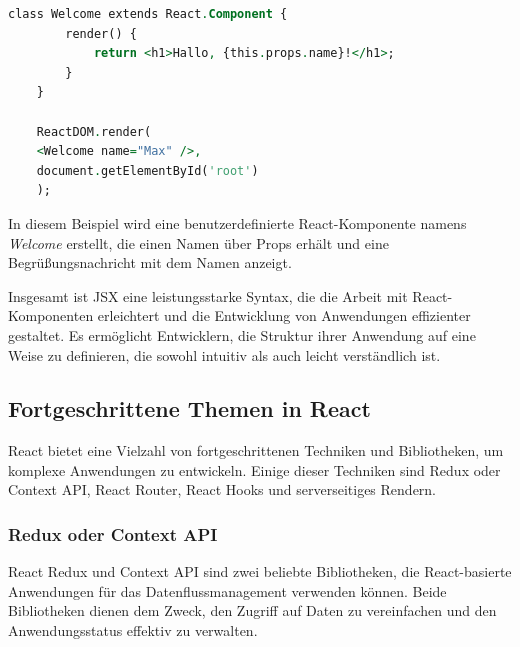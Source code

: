 \begin{lstlisting}[language=vhdl,
	frame=single,           % Ein Rahmen um den Code
	framexleftmargin=15pt,  % Rahmen link von den Zahlen
	style=algoBericht,
	label={JSX},
	captionpos=b ,          % Caption unter den Code setzen
	caption={Beispiel JSX }]
class Welcome extends React.Component {
        render() {
        	return <h1>Hallo, {this.props.name}!</h1>;
        }
    }

    ReactDOM.render(
    <Welcome name="Max" />,
    document.getElementById('root')
    );
\end{lstlisting}
In diesem Beispiel wird eine benutzerdefinierte React-Komponente namens \emph{Welcome} erstellt, die einen Namen über Props erhält und eine Begrüßungsnachricht mit dem Namen anzeigt.

Insgesamt ist JSX eine leistungsstarke Syntax, die die Arbeit mit React-Komponenten erleichtert und die Entwicklung von Anwendungen effizienter gestaltet. Es ermöglicht Entwicklern, die Struktur ihrer Anwendung auf eine Weise zu definieren, die sowohl intuitiv als auch leicht verständlich ist.

\subsection{Fortgeschrittene Themen in React}
React bietet eine Vielzahl von fortgeschrittenen Techniken und Bibliotheken, um komplexe Anwendungen zu entwickeln. Einige dieser Techniken sind Redux oder Context API, React Router, React Hooks und serverseitiges Rendern.

\subsubsection{Redux oder Context API}
React Redux und Context API sind zwei beliebte Bibliotheken, die React-basierte Anwendungen für das Datenflussmanagement verwenden können. Beide Bibliotheken dienen dem Zweck, den Zugriff auf Daten zu vereinfachen und den Anwendungsstatus effektiv zu verwalten.


